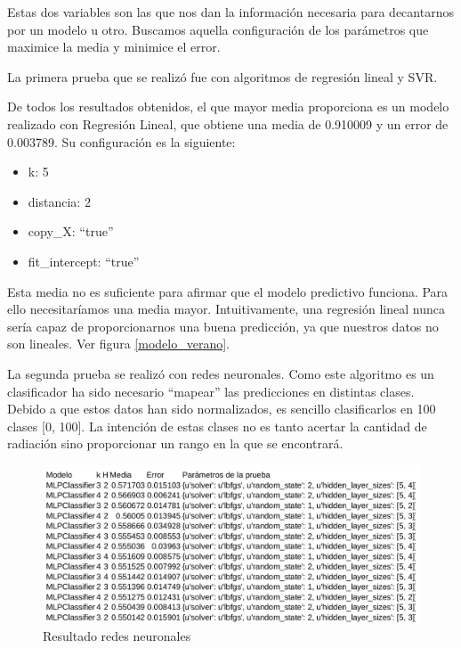 Estas dos variables son las que nos dan la información necesaria para decantarnos por un modelo u otro. Buscamos aquella configuración de los parámetros que maximice la media y minimice el error.

La primera prueba que se realizó fue con algoritmos de regresión lineal y SVR.

De todos los resultados obtenidos, el que mayor media proporciona es un modelo realizado con Regresión Lineal, que obtiene una media de 0.910009 y un error de 0.003789. Su configuración es la siguiente:

\begin{itemize}
	\item k: 5
	\item distancia: 2
	\item copy\_X: ``true''
	\item fit\_intercept: ``true''
\end{itemize}

Esta media no es suficiente para afirmar que el modelo predictivo funciona. Para ello necesitaríamos una media mayor. Intuitivamente, una regresión lineal nunca sería capaz de proporcionarnos una buena predicción, ya que nuestros datos no son lineales. Ver figura \ref{modelo_verano}.

La segunda prueba se realizó con redes neuronales. Como este algoritmo es un clasificador ha sido necesario ``mapear'' las predicciones en distintas clases. Debido a que estos datos han sido normalizados, es sencillo clasificarlos en 100 clases [0, 100]. La intención de estas clases no es tanto acertar la cantidad de radiación sino proporcionar un rango en la que se encontrará.

\begin{figure}[htb]
	\begin{center}
		\includegraphics[width=14cm]{figures/resultado_mlp.png}
		\caption{Resultado redes neuronales \label{resultado_mlp}}
	\end{center}
\end{figure}

